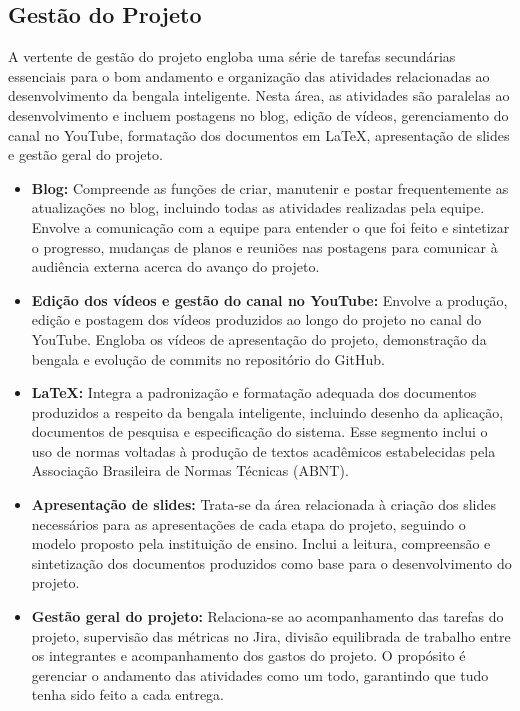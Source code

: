     \subsection{Gestão do Projeto}
    A vertente de gestão do projeto engloba uma série de tarefas secundárias essenciais para o bom andamento e organização das atividades relacionadas ao desenvolvimento da bengala inteligente. Nesta área, as atividades são paralelas ao desenvolvimento e incluem postagens no blog, edição de vídeos, gerenciamento do canal no YouTube, formatação dos documentos em LaTeX, apresentação de slides e gestão geral do projeto.


    \begin{itemize}
        \item \textbf{Blog:} Compreende as funções de criar, manutenir e postar frequentemente as atualizações no blog, incluindo todas as atividades realizadas pela equipe. Envolve a comunicação com a equipe para entender o que foi feito e sintetizar o progresso, mudanças de planos e reuniões nas postagens para comunicar à audiência externa acerca do avanço do projeto.
        
        \item \textbf{Edição dos vídeos e gestão do canal no YouTube:} Envolve a produção, edição e postagem dos vídeos produzidos ao longo do projeto no canal do YouTube. Engloba os vídeos de apresentação do projeto, demonstração da bengala e evolução de commits no repositório do GitHub.
        
        \item \textbf{LaTeX:} Integra a padronização e formatação adequada dos documentos produzidos a respeito da bengala inteligente, incluindo desenho da aplicação, documentos de pesquisa e especificação do sistema. Esse segmento inclui o uso de normas voltadas à produção de textos acadêmicos estabelecidas pela Associação Brasileira de Normas Técnicas (ABNT).
        
        \item \textbf{Apresentação de slides:} Trata-se da área relacionada à criação dos slides necessários para as apresentações de cada etapa do projeto, seguindo o modelo proposto pela instituição de ensino. Inclui a leitura, compreensão e sintetização dos documentos produzidos como base para o desenvolvimento do projeto.
        
        \item \textbf{Gestão geral do projeto:} Relaciona-se ao acompanhamento das tarefas do projeto, supervisão das métricas no Jira, divisão equilibrada de trabalho entre os integrantes e acompanhamento dos gastos do projeto. O propósito é gerenciar o andamento das atividades como um todo, garantindo que tudo tenha sido feito a cada entrega.
    \end{itemize}


